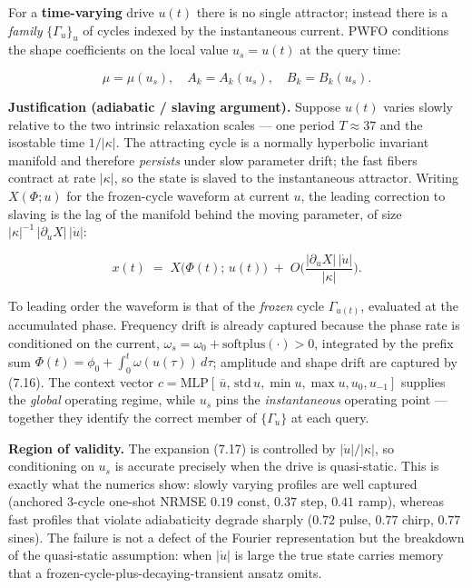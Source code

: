 \documentclass[
  11pt,
]{article}
\providecommand{\gt}{>}
\begin{document}
For a \textbf{time-varying} drive \(u(t)\) there is no single attractor;
instead there is a \emph{family} \(\{\Gamma_u\}_{u}\) of cycles indexed
by the instantaneous current. PWFO conditions the shape coefficients on
the local value \(u_s=u(t)\) at the query time:

\[
\mu=\mu(u_s),\quad A_k=A_k(u_s),\quad B_k=B_k(u_s). \tag{7.16}
\]

\textbf{Justification (adiabatic / slaving argument).} Suppose \(u(t)\)
varies slowly relative to the two intrinsic relaxation scales --- one
period \(T\approx 37\) and the isostable time \(1/|\kappa|\). The
attracting cycle is a normally hyperbolic invariant manifold and
therefore \emph{persists} under slow parameter drift; the fast fibers
contract at rate \(|\kappa|\), so the state is slaved to the
instantaneous attractor. Writing \(X(\Phi;u)\) for the frozen-cycle
waveform at current \(u\), the leading correction to slaving is the lag
of the manifold behind the moving parameter, of size
\(|\kappa|^{-1}\,\big|\partial_u X\big|\,|\dot u|\):

\[
x(t)\;=\;X\big(\Phi(t);\,u(t)\big)\;+\;O\!\Big(\frac{|\partial_u X|\,|\dot u|}{|\kappa|}\Big). \tag{7.17}
\]

To leading order the waveform is that of the \emph{frozen} cycle
\(\Gamma_{u(t)}\), evaluated at the accumulated phase. Frequency drift
is already captured because the phase rate is conditioned on the
current, \(\omega_s=\omega_0+\mathrm{softplus}(\cdot)\gt 0\), integrated
by the prefix sum \(\Phi(t)=\phi_0+\int_0^t\omega(u(\tau))\,d\tau\);
amplitude and shape drift are captured by (7.16). The context vector
\(c=\mathrm{MLP}[\,\overline u,\,\mathrm{std}\,u,\min u,\max u,u_0,u_{-1}]\)
supplies the \emph{global} operating regime, while \(u_s\) pins the
\emph{instantaneous} operating point --- together they identify the
correct member of \(\{\Gamma_u\}\) at each query.

\textbf{Region of validity.} The expansion (7.17) is controlled by
\(|\dot u|/|\kappa|\), so conditioning on \(u_s\) is accurate precisely
when the drive is quasi-static. This is exactly what the numerics show:
slowly varying profiles are well captured (anchored 3-cycle one-shot
NRMSE \(0.19\) const, \(0.37\) step, \(0.41\) ramp), whereas fast
profiles that violate adiabaticity degrade sharply (\(0.72\) pulse,
\(0.77\) chirp, \(0.77\) sines). The failure is not a defect of the
Fourier representation but the breakdown of the quasi-static assumption:
when \(|\dot u|\) is large the true state carries memory that a
frozen-cycle-plus-decaying-transient ansatz omits.
\end{document}

